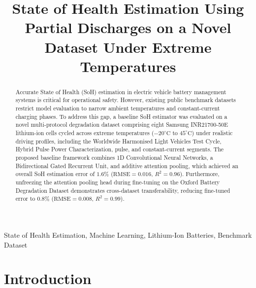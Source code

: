 \documentclass[conference]{IEEEtran}
\begin{document}
\title{State of Health Estimation Using Partial Discharges on a Novel Dataset Under Extreme Temperatures}

\author{
	\and
}

\maketitle

\begin{abstract}
	Accurate State of Health (SoH) estimation in electric vehicle battery management systems is critical for operational safety. However, existing public benchmark datasets restrict model evaluation to narrow ambient temperatures and constant-current charging phases. To address this gap, a baseline SoH estimator was evaluated on a novel multi-protocol degradation dataset comprising eight Samsung INR21700-50E lithium-ion cells cycled across extreme temperatures ($-20^\circ\text{C}$ to $45^\circ\text{C}$) under realistic driving profiles, including the Worldwide Harmonised Light Vehicles Test Cycle, Hybrid Pulse Power Characterization, pulse, and constant-current segments. The proposed baseline framework combines 1D Convolutional Neural Networks, a Bidirectional Gated Recurrent Unit, and additive attention pooling, which achieved an overall SoH estimation error of $1.6\%$ ($\text{RMSE} = 0.016$, $R^2 = 0.96$). Furthermore, unfreezing the attention pooling head during fine-tuning on the Oxford Battery Degradation Dataset demonstrates cross-dataset transferability, reducing fine-tuned error to $0.8\%$ ($\text{RMSE} = 0.008$, $R^2 = 0.99$).
\end{abstract}

\begin{IEEEkeywords}
	State of Health Estimation, Machine Learning, Lithium-Ion Batteries, Benchmark Dataset
\end{IEEEkeywords}

\section{Introduction}
\end{document}
